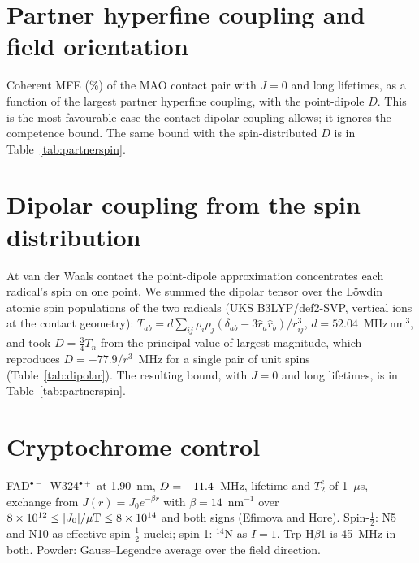\documentclass[11pt]{article}
\begin{document}
\section{Partner hyperfine coupling and field orientation}
Coherent MFE (\%) of the MAO contact pair with $J = 0$ and long lifetimes, as a
function of the largest partner hyperfine coupling, with the point-dipole $D$.
This is the most favourable case the contact dipolar coupling allows; it ignores
the competence bound. The same bound with the spin-distributed $D$ is in
Table~\ref{tab:partnerspin}.

\begin{table}[h]\centering\small
\caption{Dependence on the partner hyperfine coupling.}\label{tab:partner}

\end{table}


\section{Dipolar coupling from the spin distribution}
At van der Waals contact the point-dipole approximation concentrates each
radical's spin on one point. We summed the dipolar tensor over the L\"owdin atomic
spin populations of the two radicals (UKS B3LYP/def2-SVP, vertical ions at the
contact geometry): $T_{ab} = d\sum_{ij}\rho_i\rho_j(\delta_{ab}-3\hat r_a\hat
r_b)/r_{ij}^3$, $d = 52.04$~MHz\,nm$^3$, and took $D = \tfrac34T_n$ from the
principal value of largest magnitude, which reproduces $D = -77.9/r^3$~MHz for a
single pair of unit spins (Table~\ref{tab:dipolar}). The resulting bound, with
$J = 0$ and long lifetimes, is in Table~\ref{tab:partnerspin}.

\begin{table}[h]\centering\small
\caption{Point-dipole and spin-distributed dipolar couplings at the contact
geometry.}\label{tab:dipolar}

\end{table}

\begin{table}[h]\centering\footnotesize
\caption{Coherent MFE (\%) with the spin-distributed $D$, $J = 0$.}\label{tab:partnerspin}

\end{table}

\section{Cryptochrome control}
FAD$^{\bullet-}$--W324$^{\bullet+}$ at 1.90~nm, $D = -11.4$~MHz, lifetime and
$T_2^e$ of 1~$\mu$s, exchange from $J(r) = J_0 e^{-\beta r}$ with
$\beta = 14$~nm$^{-1}$ over $8\times10^{12}\le|J_0|/\mu{\rm T}\le8\times10^{14}$ and
both signs (Efimova and Hore). Spin-$\tfrac12$: N5 and N10 as effective
spin-$\tfrac12$ nuclei; spin-1: $^{14}$N as $I = 1$. Trp H$\beta$1 is 45~MHz in
both. Powder: Gauss--Legendre average over the field direction.

\begin{table}[h]\centering\small
\caption{Cryptochrome MFE (\%) at 50~$\mu$T.}\label{tab:cry}

\end{table}
\end{document}
